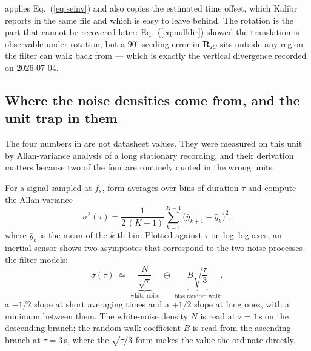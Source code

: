 \noindent {} applies Eq.~(\ref{eq:seinv}) and
also copies the estimated time offset, which Kalibr reports in the same
file and which is easy to leave behind. The rotation is the part that
cannot be recovered later: Eq.~(\ref{eq:nulldir}) showed the translation is
observable under rotation, but a $90^\circ$ seeding error in
$\mathbf{R}_{IC}$ sits outside any region the filter can walk back from ---
which is exactly the vertical divergence recorded on 2026-07-04.

\subsection{Where the noise densities come from, and the unit trap in them}
\label{sec:allan}

The four numbers in  are not datasheet values. They
were measured on this unit by Allan-variance analysis of a long stationary
recording, and their derivation matters because two of the four are
routinely quoted in the wrong units.

For a signal sampled at $f_s$, form averages over bins of duration $\tau$
and compute the Allan variance
\begin{equation}
\sigma^2(\tau) = \frac{1}{2\,(K-1)}\sum_{k=1}^{K-1}
  \bigl(\bar{y}_{k+1} - \bar{y}_k\bigr)^2 ,
\label{eq:allan}
\end{equation}
where $\bar{y}_k$ is the mean of the $k$-th bin. Plotted against $\tau$ on
log--log axes, an inertial sensor shows two asymptotes that correspond to
the two noise processes the filter models:
\begin{equation}
\sigma(\tau) \;\simeq\; \underbrace{\frac{N}{\sqrt{\tau}}}_{\text{white noise}}
  \;\oplus\; \underbrace{B\sqrt{\frac{\tau}{3}}}_{\text{bias random walk}} ,
\label{eq:allanslopes}
\end{equation}
a $-1/2$ slope at short averaging times and a $+1/2$ slope at long ones,
with a minimum between them. The white-noise density $N$ is read at
$\tau = 1$\,s on the descending branch; the random-walk coefficient $B$ is
read from the ascending branch at $\tau = 3$\,s, where the $\sqrt{\tau/3}$
form makes the value the ordinate directly.


